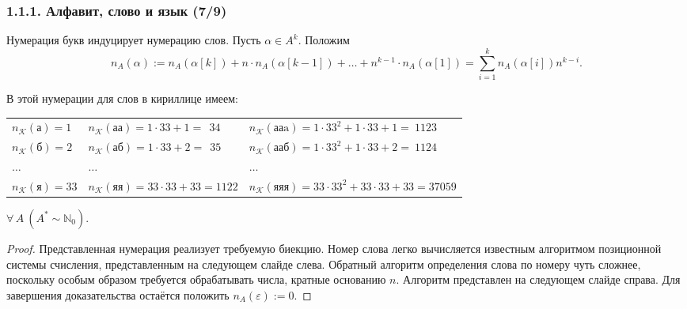 \documentclass[mathserif,12pt,aspectratio=169]{beamer}
\def\emразделенной{\em разделенной}
\def\em#1{\it\color{blue}#1}
\def\Assign{\operatorname{:=}}
\def\A#1#2{\forall\,#1\ \left(#2\right)}
\let\cal\mathcal
\let\Bbb\mathbb
\begin{document}
\begin{frame}
\frametitle{1.1.1. Алфавит, слово и язык (7/9)}

Нумерация букв индуцирует нумерацию слов.
Пусть $\alpha \in A^k$. Положим 
$$n_A(\alpha)\Assign n_A(\alpha[k])
+ n \cdot n_A(\alpha[k-1]) +\dots
+n^{k-1}\cdot n_A(\alpha[1]) = 
\sum_{i=1}^{k} n_A(\alpha[i]) n^{k-i}. $$
%

\vspace{-6pt}
\begin{example}
В этой нумерации для слов в кириллице имеем:
 
\begin{tabular}{l|l|l}
\hline
$n_{\cal{K}}(\text{а})=1$ & $n_{\cal{K}}(\text{аа})=1\cdot 33+1=~~34$ & $n_{\cal{K}}(\text{ааa})=1\cdot 33^2 +1\cdot 33 +1=~1123$  \\
$n_{\cal{K}}(\text{б})=2$ & $n_{\cal{K}}(\text{аб})=1\cdot 33+2=~~35$ & $n_{\cal{K}}(\text{ааб})=1\cdot 33^2+1\cdot 33+2=~1124$  \\
$\dots$ & $\dots$ & $\dots$ \\
$n_{\cal{K}}(\text{я})=33$ & $n_{\cal{K}}(\text{яя})=33\cdot 33+33=1122$ & $n_{\cal{K}}(\text{яяя})=33\cdot 33^2+ 33\cdot 33+33=37059$ \\
\hline
\end{tabular}
\end{example}

\medskip
\begin{theorem}
$\A{A}{A^*\sim \Bbb{N}_0}$.
\end{theorem}

\begin{proof}
Представленная нумерация реализует требуемую 
биекцию. Номер слова
легко вычисляется известным алгоритмом позиционной системы счисления, представленным
на следующем слайде слева.
Обратный алгоритм определения слова по номеру чуть сложнее, поскольку особым образом требуется
обрабатывать числа, кратные основанию $n$. Алгоритм представлен на следующем слайде справа.
Для завершения доказательства остаётся положить $n_A(\varepsilon)\Assign 0$.  
\end{proof}
 
\end{frame}
\end{document}
